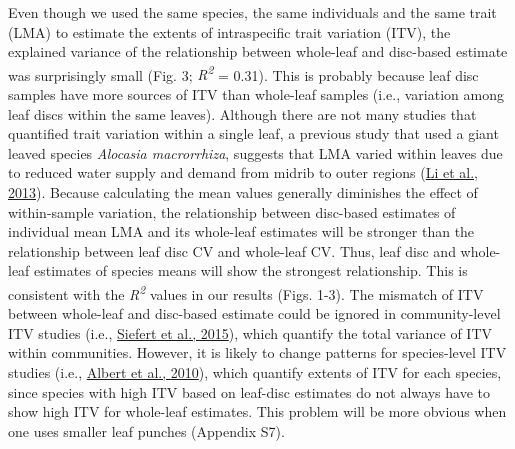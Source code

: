 \documentclass[
  12pt,
  a4paper,
,tablecaptionabove
]{scrartcl}
\begin{document}
Even though we used the same species, the same individuals and the same
trait (LMA) to estimate the extents of intraspecific trait variation
(ITV), the explained variance of the relationship between whole-leaf and
disc-based estimate was surprisingly small (Fig. 3;
\emph{R\textsuperscript{2}} = 0.31). This is probably because leaf disc
samples have more sources of ITV than whole-leaf samples (i.e.,
variation among leaf discs within the same leaves). Although there are
not many studies that quantified trait variation within a single leaf, a
previous study that used a giant leaved species \emph{Alocasia
macrorrhiza}, suggests that LMA varied within leaves due to reduced
water supply and demand from midrib to outer regions
(\protect\hyperlink{ref-Li2013a}{Li et al., 2013}). Because calculating
the mean values generally diminishes the effect of within-sample
variation, the relationship between disc-based estimates of individual
mean LMA and its whole-leaf estimates will be stronger than the
relationship between leaf disc CV and whole-leaf CV. Thus, leaf disc and
whole-leaf estimates of species means will show the strongest
relationship. This is consistent with the \emph{R\textsuperscript{2}}
values in our results (Figs. 1-3). The mismatch of ITV between
whole-leaf and disc-based estimate could be ignored in community-level
ITV studies (i.e., \protect\hyperlink{ref-Siefert2015}{Siefert et al.,
2015}), which quantify the total variance of ITV within communities.
However, it is likely to change patterns for species-level ITV studies
(i.e., \protect\hyperlink{ref-Albert2010a}{Albert et al., 2010}), which
quantify extents of ITV for each species, since species with high ITV
based on leaf-disc estimates do not always have to show high ITV for
whole-leaf estimates. This problem will be more obvious when one uses
smaller leaf punches (Appendix S7).
\end{document}

